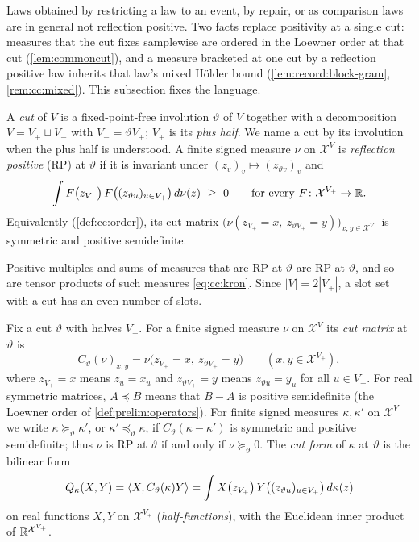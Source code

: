 Laws obtained by restricting a law to an event, by repair, or as
comparison laws are in general not reflection positive. Two facts replace positivity at a single cut: measures that the cut
fixes samplewise are ordered in the Loewner order at that cut
(\cref{lem:commoncut}), and a measure bracketed at one cut by a reflection
positive law inherits that law's mixed H\"older bound
(\cref{lem:record:block-gram}, \cref{rem:cc:mixed}). This subsection fixes the
language.

\begin{definition}\label{def:rp}
A \emph{cut} of $V$ is a fixed-point-free involution $\vartheta$ of $V$ together
with a decomposition $V=V_+\sqcup V_-$ with $V_-=\vartheta V_+$; $V_+$ is its
\emph{plus half}. We name a cut by its involution when the plus half is
understood. A finite signed measure $\nu$ on $\mathcal X^V$ is
\emph{reflection positive} (RP) at $\vartheta$ if it is invariant under
$(z_v)_v\mapsto(z_{\vartheta v})_v$ and
\[
 \int F\big(z_{V_+}\big)\,F\big((z_{\vartheta u})_{u\in V_+}\big)\,d\nu(z)\ \ge\ 0
 \qquad\text{for every }F\colon\mathcal X^{V_+}\to\R .
\]
Equivalently (\cref{def:cc:order}), its cut matrix
$\big(\nu(z_{V_+}=x,\ z_{\vartheta V_+}=y)\big)_{x,y\in\mathcal X^{V_+}}$ is
symmetric and positive semidefinite.
\end{definition}

Positive multiples and sums of measures that are RP at $\vartheta$ are RP at
$\vartheta$, and so are tensor products of such measures \eqref{eq:cc:kron}.
Since $|V|=2|V_+|$, a slot set with a cut has an even number of slots.

\begin{definition}\label{def:cc:order}
Fix a cut $\vartheta$ with halves $V_\pm$. For a finite signed measure $\nu$
on $\mathcal X^V$ its \emph{cut matrix} at $\vartheta$ is
\[
 C_\vartheta(\nu)_{x,y}=\nu\big(z_{V_+}=x,\ z_{\vartheta V_+}=y\big)
 \qquad(x,y\in\mathcal X^{V_+}),
\]
where $z_{V_+}=x$ means $z_u=x_u$ and $z_{\vartheta V_+}=y$ means
$z_{\vartheta u}=y_u$ for all $u\in V_+$. For real symmetric matrices,
$A\preceq B$ means that $B-A$ is positive semidefinite (the Loewner order of
\cref{def:prelim:operators}). For finite signed
measures $\kappa,\kappa'$ on $\mathcal X^V$ we write $\kappa\succeq_\vartheta\kappa'$,
or $\kappa'\preceq_\vartheta\kappa$, if $C_\vartheta(\kappa-\kappa')$ is
symmetric and positive semidefinite; thus $\nu$ is RP at $\vartheta$ if and
only if $\nu\succeq_\vartheta0$. The \emph{cut form} of $\kappa$ at $\vartheta$
is the bilinear form
\[
 Q_\kappa(X,Y)=\left\langle X,C_\vartheta(\kappa)Y\right\rangle
 =\int X\big(z_{V_+}\big)\,Y\big((z_{\vartheta u})_{u\in V_+}\big)\,d\kappa(z)
\]
on real functions $X,Y$ on $\mathcal X^{V_+}$ (\emph{half-functions}), with the
Euclidean inner product of $\mathbb R^{\mathcal X^{V_+}}$.
\end{definition}

